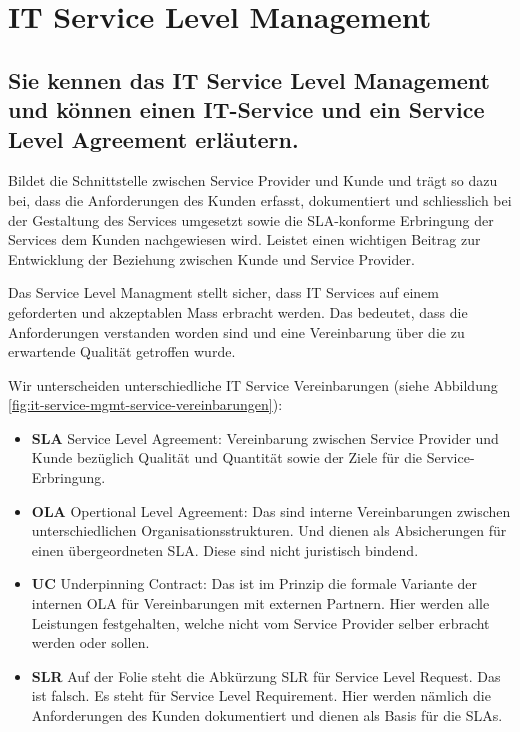 \section{IT Service Level Management}
\label{sec:service-level-management}

\subsection{Sie kennen das IT Service Level Management und können einen IT-Service und ein Service Level Agreement erläutern.}
Bildet die Schnittstelle zwischen Service Provider und Kunde und trägt so dazu bei, dass die Anforderungen des Kunden erfasst, dokumentiert und schliesslich bei der Gestaltung des Services umgesetzt sowie die SLA-konforme Erbringung der Services dem Kunden nachgewiesen wird. Leistet einen wichtigen Beitrag zur Entwicklung der Beziehung zwischen Kunde und Service Provider.

Das Service Level Managment stellt sicher, dass IT Services auf einem geforderten und akzeptablen Mass erbracht werden. Das bedeutet, dass die Anforderungen verstanden worden sind und eine Vereinbarung über die zu erwartende Qualität getroffen wurde.

Wir unterscheiden unterschiedliche IT Service Vereinbarungen (siehe Abbildung \ref{fig:it-service-mgmt-service-vereinbarungen}):

\begin{itemize}
	\item \textbf{SLA} Service Level Agreement: Vereinbarung zwischen Service Provider und Kunde bezüglich Qualität und Quantität sowie der Ziele für die Service-Erbringung.
	\item \textbf{OLA} Opertional Level Agreement: Das sind interne Vereinbarungen zwischen unterschiedlichen Organisationsstrukturen. Und dienen als Absicherungen für einen übergeordneten SLA. Diese sind nicht juristisch bindend.
	\item \textbf{UC} Underpinning Contract: Das ist im Prinzip die formale Variante der internen OLA für Vereinbarungen mit externen Partnern. Hier werden alle Leistungen festgehalten, welche nicht vom Service Provider selber erbracht werden oder sollen.
	\item \textbf{SLR} Auf der Folie steht die Abkürzung SLR für Service Level Request. Das ist falsch. Es steht für Service Level Requirement. Hier werden nämlich die Anforderungen des Kunden dokumentiert und dienen als Basis für die SLAs.
\end{itemize}

